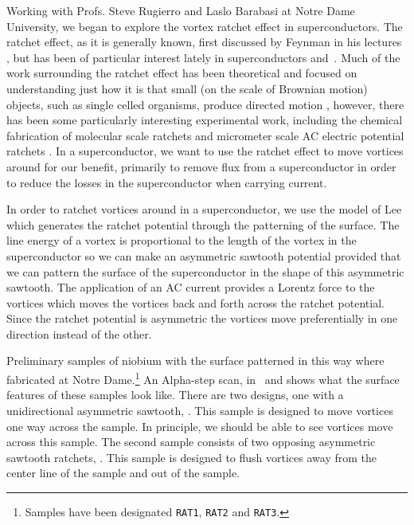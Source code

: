 Working with Profs. Steve Rugierro and Laslo Barabasi 
at Notre Dame University, we began
to explore the vortex ratchet effect in superconductors. 
The ratchet effect, as it is 
generally known, first discussed by Feynman
in his lectures \cite{feynmann_lectures},
but has been of particular interest lately in 
superconductors \cite{lee_nature_400_337_1999} and 
\jjas\,\cite{falo_epl_45_700_1999,goldobin_condmat_aug_2000,%
trias_pre_61_2257_2000,wambaugh_prl_83_5106_1999,zapata_prl_77_2292_1996}.
Much of the work surrounding the ratchet effect has been theoretical and 
focused on
understanding just how it is that small (on the scale of Brownian
motion) objects, such as single celled organisms, produce directed
motion
\cite{astumian_science_276_917_1997,astumian_chaos_8_533_1998,%
julicher_rmp_69_1269_1997,magnasco_prl_71_1477_1993}, 
however, there has been some
particularly interesting experimental work, including the chemical
fabrication of molecular scale ratchets \cite{kelly_jorgchem_63_3655_1998}
and micrometer scale AC electric potential ratchets
\cite{prost_prl_72_2652_1994,faucheux_prl_74_1504_1995}.
In a superconductor, we want to use the ratchet effect to 
move vortices around for our benefit, primarily to remove flux
from a superconductor in order to reduce the losses in the 
superconductor when carrying current. 

In order to ratchet vortices around in a superconductor, 
we use the model of Lee \etal\,\cite{lee_nature_400_337_1999}
which 
generates the ratchet potential through the patterning of the 
surface. The line energy of a vortex is
proportional to the length of the vortex in the superconductor
\cite{tinkham} so we can make an asymmetric sawtooth potential
provided that we can pattern the surface of the superconductor
in the shape of this asymmetric sawtooth. The application of an AC
current provides a Lorentz force to the vortices which moves the 
vortices back and forth across the ratchet potential. Since
the ratchet potential is asymmetric the vortices move preferentially
in one direction instead of the other. 

Preliminary samples of niobium with the surface patterned in this way where
fabricated at Notre Dame.\footnote{Samples have been designated
\texttt{RAT1}, \texttt{RAT2} and \texttt{RAT3}. } An Alpha-step%
\cite{kla_tencor} scan, 
in \ and  
shows what the surface features
of these samples look like. There are two designs, one with a unidirectional
asymmetric sawtooth, . This 
sample is designed to move vortices one way across the sample. In principle,
we should be able to see vortices move across this sample. 
The second sample consists of two opposing asymmetric sawtooth ratchets,
. This sample is designed to flush
vortices away from the center line of the sample and out of the sample. 

